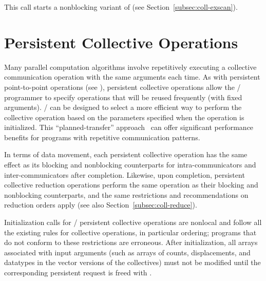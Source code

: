 This call starts a nonblocking variant of  (see
Section~\ref{subsec:coll-exscan}).


\section{Persistent Collective Operations}
\label{sec:coll-persistent}
\label{sec:pcoll}

Many parallel computation algorithms
involve repetitively executing
a collective communication operation
with the same arguments each time.
As with persistent point-to-point operations (see ),
persistent collective operations allow the \MPI/ programmer to specify operations
that will be reused frequently (with fixed arguments).
\MPI/ can be designed to select a more efficient
way to perform the collective operation
based on the parameters specified when the operation is initialized.
This ``planned-transfer'' approach~\cite{Morgan:2017:PPP:3127024.3127028,HOLMES201932} can offer significant performance benefits
for programs with repetitive communication patterns.

In terms of data movement, each persistent collective operation has
the same effect as its blocking and nonblocking counterparts for intra-communicators and
inter-communicators after completion.
%
Likewise, upon completion,
persistent collective reduction operations
perform the same operation as their blocking and nonblocking counterparts,
and the same restrictions and recommendations on reduction orders apply (see also Section~\ref{subsec:coll-reduce}).

Initialization calls for
\MPI/ persistent collective operations
are nonlocal and
follow all the existing rules for
collective operations,
in particular ordering;
programs that do not conform to these restrictions
are erroneous.
%
After initialization,
all
arrays associated with input arguments
(such as arrays of counts, displacements, and
datatypes in the vector versions of the collectives)
must  not be modified
until the corresponding persistent request is freed with .

